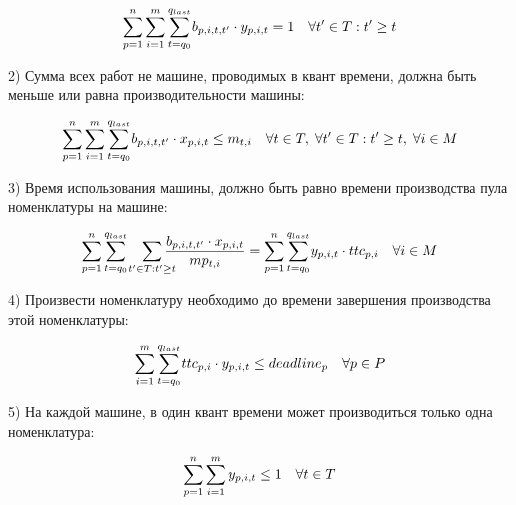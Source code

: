 \documentclass[14pt,fleqn]{extarticle}
\begin{document}
	\begin{ceqn}
		\begin{align*}
			\smashoperator[r]{\sum_{p = 1}^{n}} \smashoperator[r]{\sum_{i = 1}^{m}} \smashoperator[r]{\sum_{t = q_0}^{q_{last}}} b_{p,i,t,t'} \cdot y_{p,i,t} = 1 \quad \forall t' \in T: t' \geq t
		\end{align*}
	\end{ceqn}
	
	2) Сумма всех работ не машине, проводимых в квант времени, должна быть меньше или равна производительности машины:
	
	\begin{ceqn}
		\begin{align*}
			\smashoperator[r]{\sum_{p = 1}^{n}} \smashoperator[r]{\sum_{i = 1}^{m}} \smashoperator[r]{\sum_{t = q_0}^{q_{last}}} b_{p,i,t,t'} \cdot x_{p,i,t} \leq m_{t,i} \quad \forall t \in T, \; \forall t' \in T: t' \geq t, \; \forall i \in M
		\end{align*}
	\end{ceqn}
	
	3) Время использования машины, должно быть равно времени производства пула номенклатуры на машине:
	
	\begin{ceqn}
		\begin{align*}
			\smashoperator[r]{\sum_{p = 1}^{n}} \smashoperator[r]{\sum_{t = q_0}^{q_{last}}} \smashoperator[r]{\sum_{t' \in T: t' \geq t}} \dfrac{b_{p,i,t,t'} \cdot x_{p,i,t}}{mp_{t,i}} = \smashoperator[r]{\sum_{p = 1}^{n}} \smashoperator[r]{\sum_{t = q_0}^{q_{last}}} y_{p,i,t} \cdot ttc_{p,i} \quad \forall i \in M
		\end{align*}
	\end{ceqn}
	
	\newpage
	
	4) Произвести номенклатуру необходимо до времени завершения производства этой номенклатуры:
	
	\begin{ceqn}
		\begin{align*}
			\smashoperator[r]{\sum_{i = 1}^{m}} \smashoperator[r]{\sum_{t = q_0}^{q_{last}}} ttc_{p,i} \cdot y_{p,i,t} \leq deadline_p \quad \forall p \in P
		\end{align*}
	\end{ceqn}

	5) На каждой машине, в один квант времени может производиться только одна номенклатура:
	
	\begin{ceqn}
		\begin{align*}
			\smashoperator[r]{\sum_{p = 1}^{n}} \smashoperator[r]{\sum_{i = 1}^{m}} y_{p,i,t} \leq 1 \quad \forall t \in T
		\end{align*}
	\end{ceqn}
\end{document}
